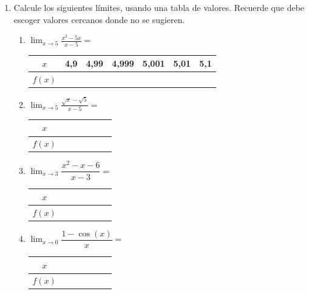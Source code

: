 \documentclass[fleqn,10pt]{article}
\let\ds\displaystyle
\begin{document}
\ExamNameLine
\begin{enumerate}
   \item Calcule los siguientes límites, usando una tabla de valores. Recuerde que debe escoger valores cercanos donde no se sugieren.
      \begin{enumerate}
	 \item $\ds{\lim_{x\rightarrow5}\frac{x^2-5x}{x-5}}=$
\begin{center}
   \begin{tabular}{|c|p{1.5cm}|p{1.5cm}|p{1.5cm}||p{1.5cm}|p{1.5cm}|p{1.5cm}|}
\hline 
$x$ & 4,9 & 4,99 & 4,999 & 5,001 & 5,01 & 5,1  \\ 
\hline 
$f(x)$ &  &  &  &  & & \\ 
\hline 
\end{tabular} 
\end{center}	 
	 \item $\ds{\lim_{x\rightarrow5}\frac{\sqrt{x}-\sqrt{5}}{x-5}}=$
\begin{center}
   \begin{tabular}{|c|p{1.5cm}|p{1.5cm}|p{1.5cm}||p{1.5cm}|p{1.5cm}|p{1.5cm}|}
\hline 
$x$ &  &  &  &  &  &  \\ 
\hline 
$f(x)$ &  &  &  &  & & \\ 
\hline 
\end{tabular} 
\end{center}	
	\item $\ds{\lim_{x\rightarrow3}\dfrac{x^2-x-6}{x-3}}=$
	\begin{center}
   \begin{tabular}{|c|p{1.5cm}|p{1.5cm}|p{1.5cm}||p{1.5cm}|p{1.5cm}|p{1.5cm}|}
\hline 
$x$ &  &  &  &  &  &  \\ 
\hline 
$f(x)$ &  &  &  &  & & \\ 
\hline 
\end{tabular} 
\end{center}	
	\item $\ds{\lim_{x\rightarrow0}\dfrac{1-\cos(x)}{x}}=$
	\begin{center}
   \begin{tabular}{|c|p{1.5cm}|p{1.5cm}|p{1.5cm}||p{1.5cm}|p{1.5cm}|p{1.5cm}|}
\hline 
$x$ &  &  &  &  &  &  \\ 
\hline 
$f(x)$ &  &  &  &  & & \\ 
\hline 
\end{tabular} 

\end{center}
\end{enumerate}
\end{enumerate}
\end{document}
